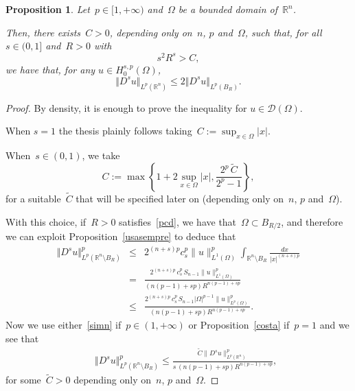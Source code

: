 \documentclass[11pt,hyp,]{nyjm}
\numberwithin{equation}{section}
\newcommand{\R}{\mathbb{R}}
\newtheorem{proposition}[theorem]{Proposition}
\theoremstyle{remark}
\renewcommand{\leq}{\leqslant}
\renewcommand{\le}{\leqslant}
\begin{document}
\begin{proposition}\label{doverf}
Let~$p \in [1, +\infty)$ and~$\Omega$ be a bounded domain of~$\R^n$. 

Then, there exists~${C}>0$, depending only on~$n$, $p$ and~$\Omega$, such that, for all~$s\in(0,1]$
and~$R>0$ with
\begin{equation}\label{pcd}
s^{2}R^s> C ,
\end{equation} 
we have that, for any $u \in H^{s,p}_0(\Omega)$,
\begin{equation}\label{hdowe}
 \Vert D^s u \Vert_{L^p(\R^n)} \leq 2 \Vert D^s u \Vert_{L^p(B_R)} .
\end{equation}
\end{proposition}

\begin{proof}
By density, it is enough to prove the inequality for $u\in \mathcal{D}(\Omega)$.

When $s=1$ the thesis plainly follows taking~$C:={\sup_{x\in\Omega} |x|}$.

When~$s\in(0,1)$, we take
\begin{equation}\label{feutyjkrt8456}
C:=\max\left\{ 1+2\sup_{x\in\Omega}|x|, \frac{2^p\,\widetilde C}{2^p-1}\right\},\end{equation}
for a suitable~$\widetilde C$ that will be specified later on (depending only on~$n$, $p$ and~$\Omega$).

With this choice, if~$R>0$ satisfies~\eqref{pcd}, we have that~$\Omega\subset B_{R/2}$, and therefore
we can exploit Proposition~\ref{usasempre} to deduce that
\begin{eqnarray*} 
\Vert D^s u \Vert^p_{L^p(\R^n \setminus B_{R})} &\le& 2^{(n+s)p} c_s^p\|u\|^p_{L^1(\Omega)}
\int_{\R^n \setminus B_{R}}\frac{dx}{|x|^{(n+s)p} }\\&=&\frac{
2^{(n+s)p} \,c_s^p \,S_{n-1}\|u\|^p_{L^1(\Omega)}}{(n(p-1)+sp) R^{n(p-1)+sp}}\\ &
\le& \frac{
2^{(n+s)p} \,c_s^p \,S_{n-1}|\Omega|^{p-1}\|u\|^p_{L^p(\Omega)}}{(n(p-1)+sp) R^{n(p-1)+sp}}.
\end{eqnarray*}
Now we use either~\eqref{simn} if~$p\in(1,+\infty)$ or
Proposition~\ref{costa} if~$p=1$ and we see that
\begin{eqnarray*} &&
\Vert D^s u \Vert^p_{L^p(\R^n \setminus B_{R})} 
\le \frac{\widetilde C \|D^su\|^p_{L^p(\R^n)}}{s\,(n(p-1)+sp) R^{n(p-1)+sp}},
\end{eqnarray*}
for some~$\widetilde C>0$ depending only on~$n$, $p$ and~$\Omega$.


\end{proof}
\end{document}

